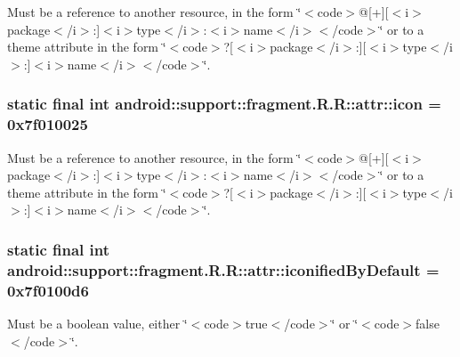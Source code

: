 Must be a reference to another resource, in the form \char`\"{}$<$code$>$@\mbox{[}+\mbox{]}\mbox{[}$<$i$>$package$<$/i$>$:\mbox{]}$<$i$>$type$<$/i$>$:$<$i$>$name$<$/i$>$$<$/code$>$\char`\"{} or to a theme attribute in the form \char`\"{}$<$code$>$?\mbox{[}$<$i$>$package$<$/i$>$:\mbox{]}\mbox{[}$<$i$>$type$<$/i$>$:\mbox{]}$<$i$>$name$<$/i$>$$<$/code$>$\char`\"{}. \hypertarget{classandroid_1_1support_1_1fragment_1_1_r_1_1attr_77fa5d27c2a18f9225039bcb8193ba68}{
\subsubsection[{icon}]{\setlength{\rightskip}{0pt plus 5cm}static final int android::support::fragment.R.R::attr::icon = 0x7f010025}}
\label{classandroid_1_1support_1_1fragment_1_1_r_1_1attr_77fa5d27c2a18f9225039bcb8193ba68}


Must be a reference to another resource, in the form \char`\"{}$<$code$>$@\mbox{[}+\mbox{]}\mbox{[}$<$i$>$package$<$/i$>$:\mbox{]}$<$i$>$type$<$/i$>$:$<$i$>$name$<$/i$>$$<$/code$>$\char`\"{} or to a theme attribute in the form \char`\"{}$<$code$>$?\mbox{[}$<$i$>$package$<$/i$>$:\mbox{]}\mbox{[}$<$i$>$type$<$/i$>$:\mbox{]}$<$i$>$name$<$/i$>$$<$/code$>$\char`\"{}. \hypertarget{classandroid_1_1support_1_1fragment_1_1_r_1_1attr_1111f6cba1d2c815a489bc6e762e66e9}{
\subsubsection[{iconifiedByDefault}]{\setlength{\rightskip}{0pt plus 5cm}static final int android::support::fragment.R.R::attr::iconifiedByDefault = 0x7f0100d6}}
\label{classandroid_1_1support_1_1fragment_1_1_r_1_1attr_1111f6cba1d2c815a489bc6e762e66e9}


Must be a boolean value, either \char`\"{}$<$code$>$true$<$/code$>$\char`\"{} or \char`\"{}$<$code$>$false$<$/code$>$\char`\"{}. 

